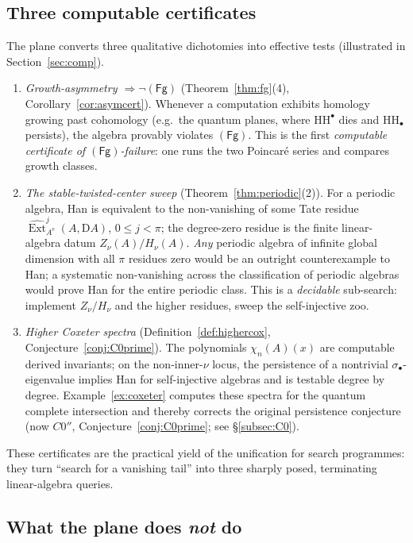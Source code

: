 \documentclass[11pt]{amsart}
\theoremstyle{definition}
\newcommand{\HH}{\mathrm{HH}}
\newcommand{\D}{\mathrm{D}}
\newcommand{\sExt}{\widehat{\operatorname{Ext}}}
\newcommand{\Ae}{A^{\mathrm{e}}}
\newcommand{\Fg}{\mathsf{(Fg)}}
\begin{document}
\subsection{Three computable certificates}\label{ss:certificates}

The plane converts three qualitative dichotomies into effective tests
(illustrated in Section~\ref{sec:comp}).

\begin{enumerate}[label=\textup{(C\arabic*)},leftmargin=2.6em]
\item \emph{Growth-asymmetry $\Rightarrow\neg\Fg$} (Theorem~\ref{thm:fg}(4),
Corollary~\ref{cor:asymcert}). Whenever a computation exhibits homology growing
past cohomology (e.g.\ the quantum planes, where $\HH^\bullet$ dies and
$\HH_\bullet$ persists), the algebra provably violates $\Fg$. This is the
first \emph{computable certificate of $\Fg$-failure}: one runs the two
Poincar\'e series and compares growth classes.
\item \emph{The stable-twisted-center sweep} (Theorem~\ref{thm:periodic}(2)).
For a periodic algebra, Han is equivalent to the non-vanishing of some Tate
residue $\sExt^j_{\Ae}(A,\D A)$, $0\le j<\pi$; the degree-zero residue is the
finite linear-algebra datum $Z_\nu(A)/H_\nu(A)$. \emph{Any} periodic algebra of
infinite global dimension with all $\pi$ residues zero would be an outright
counterexample to Han; a systematic non-vanishing across the classification of
periodic algebras would prove Han for the entire periodic class. This is a
\emph{decidable} sub-search: implement $Z_\nu/H_\nu$ and the higher residues,
sweep the self-injective zoo.
\item \emph{Higher Coxeter spectra} (Definition~\ref{def:highercox},
Conjecture~\ref{conj:C0prime}). The polynomials $\chi_n(A)(x)$ are computable
derived invariants; on the non-inner-$\nu$ locus, the persistence of a
nontrivial $\sigma_\bullet$-eigenvalue implies Han for self-injective algebras
and is testable degree by degree. Example~\ref{ex:coxeter}
computes these spectra for the quantum complete intersection and thereby
corrects the original persistence conjecture (now $C0''$,
Conjecture~\ref{conj:C0prime}; see \S\ref{subsec:C0}).
\end{enumerate}

These certificates are the practical yield of the unification for
search programmes: they turn ``search for a
vanishing tail'' into three sharply posed, terminating linear-algebra queries.

\subsection{What the plane does \emph{not} do}\label{ss:limits}
\end{document}
